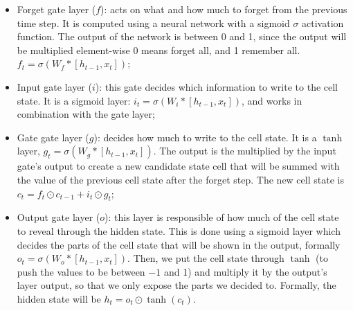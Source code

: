 \begin{itemize}[-]
    \item Forget gate layer ($f$): acts on what and how much to forget from the previous time step. It is computed using a neural network with a sigmoid $\sigma$ activation function. The output of the network is between 0 and 1, since the output will be multiplied element-wise 0 means forget all, and 1 remember all. $f_t = \sigma(W_f * [h_{t-1}, x_t])$;
    \item Input gate layer ($i$): this gate decides which information to write to the cell state. It is a sigmoid layer: $i_t = \sigma(W_i * [h_{t-1}, x_t])$, and works in combination with the gate layer; 
    \item Gate gate layer ($g$): decides how much to write to the cell state. It is a $\tanh$ layer, $g_t = \sigma(W_g * [h_{t-1}, x_t])$. The output is the multiplied by the input gate's output to create a new candidate state cell that will be summed with the value of the previous cell state after the forget step. The new cell state is  $c_t = f_t \odot c_{t-1} + i_t \odot g_t$;
    \item Output gate layer ($o$): this layer is responsible of how much of the cell state to reveal through the hidden state. This is done using a sigmoid layer which decides the parts of the cell state that will be shown in the output, formally $o_t = \sigma(W_o * [h_{t-1}, x_t])$. Then, we put the cell state through $\tanh$ (to push the values to be between $-1$ and 1) and multiply it by the output's layer output, so that we only expose the parts we decided to. Formally, the hidden state will be $h_t = o_t \odot \tanh(c_t)$.
\end{itemize}



